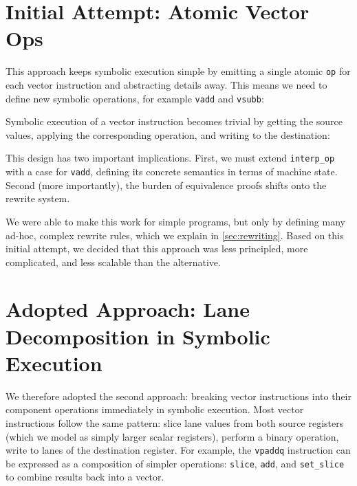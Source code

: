 \section{Initial Attempt: Atomic Vector Ops}
\label{sec:atomic-op}

This approach keeps symbolic execution simple by emitting a single atomic \texttt{op} for each vector instruction and abstracting details away.
This means we need to define new symbolic operations, for example \texttt{vadd} and \texttt{vsubb}:


Symbolic execution of a vector instruction becomes trivial by getting the source values, applying the corresponding operation, and writing to the destination:


This design has two important implications.
First, we must extend \texttt{interp_op} with a case for \texttt{vadd}, defining its concrete semantics in terms of machine state.
Second (more importantly), the burden of equivalence proofs shifts onto the rewrite system.

We were able to make this work for simple programs, but only by defining many ad-hoc, complex rewrite rules, which we explain in \autoref{sec:rewriting}. Based on this initial attempt, we decided that this approach was less principled, more complicated, and less scalable than the alternative.

\section{Adopted Approach: Lane Decomposition in Symbolic Execution}
\label{sec:lane-decomposition}

We therefore adopted the second approach: breaking vector instructions into their component operations immediately in symbolic execution.
Most vector instructions follow the same pattern: slice lane values from both source registers (which we model as simply larger scalar registers), perform a binary operation, write to lanes of the destination register.
For example, the \texttt{vpaddq} instruction can be expressed as a composition of simpler operations: \texttt{slice}, \texttt{add}, and \texttt{set_slice} to combine results back into a vector.


